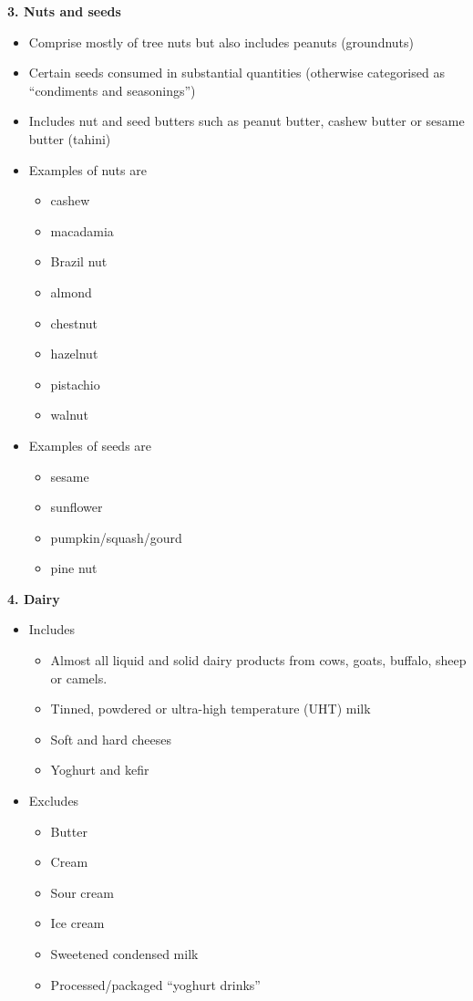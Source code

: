 \documentclass[12pt,]{book}
\providecommand{\tightlist}{%
  \setlength{\itemsep}{0pt}\setlength{\parskip}{0pt}}
\theoremstyle{definition}
\theoremstyle{definition}
\theoremstyle{definition}
\theoremstyle{remark}
\begin{document}
\textbf{3. Nuts and seeds}

\begin{itemize}
\tightlist
\item
  Comprise mostly of tree nuts but also includes peanuts (groundnuts)
\item
  Certain seeds consumed in substantial quantities (otherwise
  categorised as ``condiments and seasonings'')
\item
  Includes nut and seed butters such as peanut butter, cashew butter or
  sesame butter (tahini)
\item
  Examples of nuts are

  \begin{itemize}
  \tightlist
  \item
    cashew
  \item
    macadamia
  \item
    Brazil nut
  \item
    almond
  \item
    chestnut
  \item
    hazelnut
  \item
    pistachio
  \item
    walnut
  \end{itemize}
\item
  Examples of seeds are

  \begin{itemize}
  \tightlist
  \item
    sesame
  \item
    sunflower
  \item
    pumpkin/squash/gourd
  \item
    pine nut
  \end{itemize}
\end{itemize}

\textbf{4. Dairy}

\begin{itemize}
\tightlist
\item
  Includes

  \begin{itemize}
  \tightlist
  \item
    Almost all liquid and solid dairy products from cows, goats,
    buffalo, sheep or camels.
  \item
    Tinned, powdered or ultra-high temperature (UHT) milk
  \item
    Soft and hard cheeses
  \item
    Yoghurt and kefir
  \end{itemize}
\item
  Excludes

  \begin{itemize}
  \tightlist
  \item
    Butter
  \item
    Cream
  \item
    Sour cream
  \item
    Ice cream
  \item
    Sweetened condensed milk
  \item
    Processed/packaged ``yoghurt drinks''
  \end{itemize}
\end{itemize}
\end{document}
